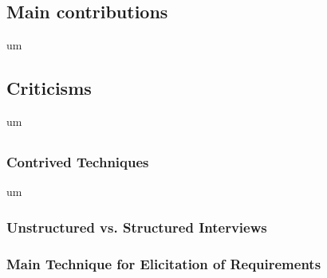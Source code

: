\documentclass[letterpaper,12pt]{article}
\begin{document}
\subsection{Main contributions} %
um

\subsection{Criticisms} %
um
\subsection{}

\subsubsection{Contrived Techniques}
um

\subsubsection{Unstructured vs. Structured Interviews}


\subsubsection{Main Technique for Elicitation of Requirements}
\end{document}
